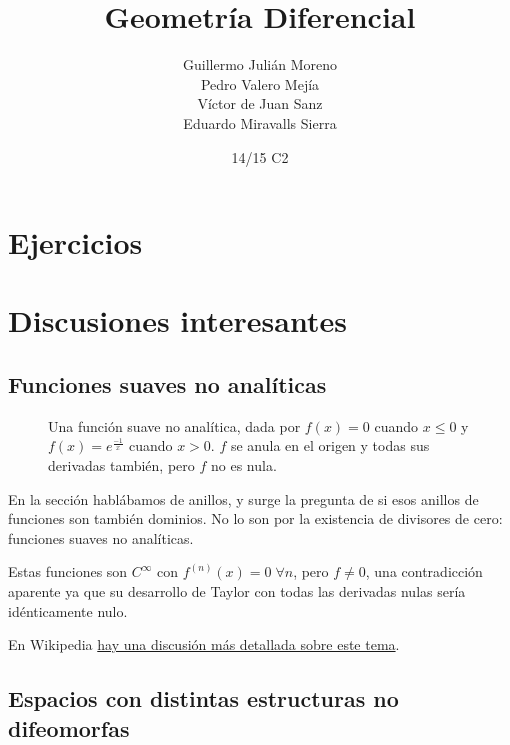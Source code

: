 \documentclass[palatino]{apuntes}
\title{Geometría Diferencial}
\author{Guillermo Julián Moreno \\ Pedro Valero Mejía \\ Víctor de Juan Sanz \\ Eduardo Miravalls Sierra}
\date{14/15 C2}
\begin{document}
\pagestyle{plain}
\maketitle

\renewcommand{\theauthor}{Guillermo Julián Moreno}

\tableofcontents
\newpage








\appendix

\chapter{Ejercicios}


\chapter{Discusiones interesantes}

\section{Funciones suaves no analíticas}

\begin{figure}[hbtp]
\centering
{}
\caption{Una función suave no analítica, dada por $f(x) = 0$ cuando $x ≤ 0$ y $f(x) = e^{\frac{-1}{x}}$ cuando $x > 0$. $f$ se anula en el origen y todas sus derivadas también, pero $f$ no es nula.}
\end{figure}

En la sección  hablábamos de anillos, y surge la pregunta de si esos anillos de funciones son también dominios. No lo son por la existencia de divisores de cero: funciones suaves no analíticas.

Estas funciones son $C^∞$ con $f^{(n)}(x) = 0\; ∀n$, pero $f ≠ 0$, una contradicción aparente ya que su desarrollo de Taylor con todas las derivadas nulas sería idénticamente nulo.

En Wikipedia \href{http://en.wikipedia.org/wiki/Non-analytic_smooth_function}{hay una discusión más detallada sobre este tema}.

\section{Espacios con distintas estructuras no difeomorfas}
\label{sec:MismoEspacioNoDifeomorfo}
\end{document}
